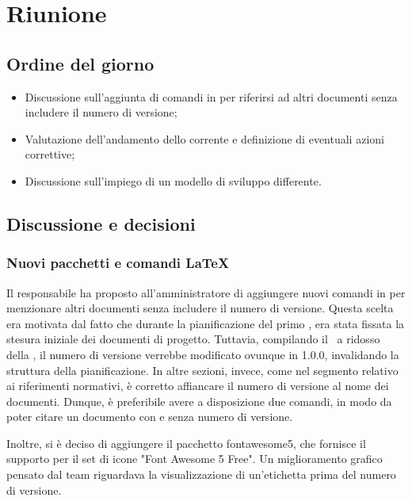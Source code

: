 \section{Riunione}
\subsection{Ordine del giorno}
\begin{itemize}
	\item Discussione sull'aggiunta di comandi in  per riferirsi ad altri documenti senza includere il numero di versione;
  \item Valutazione dell'andamento dello  corrente e definizione di eventuali azioni correttive;
  \item Discussione sull'impiego di un modello di sviluppo differente.
\end{itemize}

\subsection{Discussione e decisioni}

\subsubsection{Nuovi pacchetti e comandi LaTeX}
\par Il responsabile ha proposto all'amministratore di aggiungere nuovi comandi in  per menzionare altri documenti senza includere il numero di versione. Questa scelta era motivata dal fatto che durante la pianificazione del primo , era stata fissata la stesura iniziale dei documenti di progetto. Tuttavia, compilando il \PdP\ a ridosso della , il numero di versione verrebbe modificato ovunque in 1.0.0, invalidando la struttura della pianificazione. In altre sezioni, invece, come nel segmento relativo ai riferimenti normativi, è corretto affiancare il numero di versione al nome dei documenti. Dunque, è preferibile avere a disposizione due comandi, in modo da poter citare un documento con e senza numero di versione.
\par Inoltre, si è deciso di aggiungere il pacchetto fontawesome5, che fornisce il supporto  per il set di icone "Font Awesome 5 Free". Un miglioramento grafico pensato dal team riguardava la visualizzazione di un'etichetta prima del numero di versione.

